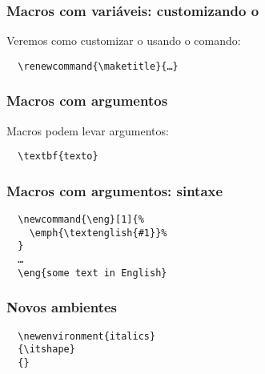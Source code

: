 \begin{frame}[fragile]
  \frametitle{Macros com variáveis: customizando o
  \latexcode{\maketitle}}
  \LARGE
  Veremos como customizar o \latexcode{\maketitle} usando o comando:

  \begin{verbatim}
  \renewcommand{\maketitle}{…}
  \end{verbatim}
\end{frame}

\begin{frame}[fragile]
  \frametitle{Macros com argumentos}
  \LARGE
  Macros podem levar argumentos:

  \begin{verbatim}
  \textbf{texto}
  \end{verbatim}
\end{frame}

\begin{frame}[fragile]
  \frametitle{Macros com argumentos: sintaxe}
  \begin{verbatim}
  \newcommand{\eng}[1]{%
    \emph{\textenglish{#1}}%
  }
  …
  \eng{some text in English}
  \end{verbatim}
\end{frame}

\begin{frame}[fragile]
  \frametitle{Novos ambientes}
  \begin{verbatim}
  \newenvironment{italics}
  {\itshape}
  {}
  \end{verbatim}
\end{frame}

